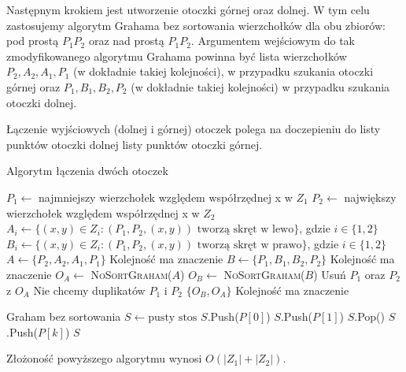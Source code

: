 Następnym krokiem jest utworzenie otoczki górnej oraz dolnej.
W tym celu zastosujemy algorytm Grahama bez sortowania 
wierzchołków dla obu
zbiorów: pod prostą $P_1P_2$ oraz nad prostą $P_1P_2$. 
Argumentem wejściowym do tak zmodyfikowanego algorytmu Grahama 
powinna być lista wierzchołków $P_2, A_2, A_1, P_1$
(w dokładnie takiej kolejności), w 
przypadku szukania otoczki górnej oraz $P_1, B_1, B_2, P_2$
(w dokładnie takiej kolejności) w przypadku
szukania otoczki dolnej.

Łączenie wyjściowych (dolnej i górnej) otoczek polega na 
doczepieniu do listy punktów otoczki dolnej listy punktów otoczki górnej.

\begin{algorithm}[H]
	\caption{Algorytm łączenia dwóch otoczek}
	\begin{algorithmic}[1]
		\State $P_1 \gets$ najmniejszy wierzchołek względem współrzędnej x w $Z_1$
		\State $P_2 \gets$ największy wierzchołek względem współrzędnej x w $Z_2$
		\State $A_i \gets \{(x, y) \in Z_i : (P_1, P_2, (x,y)) \text{ tworzą skręt w lewo}\}$, gdzie $i \in \{1, 2\}$
		\State $B_i \gets \{(x, y) \in Z_i : (P_1, P_2, (x,y)) \text{ tworzą skręt w prawo}\}$, gdzie $i \in \{1, 2\}$
		\State $A \gets \{P_2, A_2, A_1, P_1\}$ \Comment Kolejność ma znaczenie
		\State $B \gets \{P_1, B_1, B_2, P_2\}$ \Comment Kolejność ma znaczenie
		\State $O_A \gets$ \textsc{NoSortGraham($A$)}
		\State $O_B \gets$ \textsc{NoSortGraham($B$)}
		\State Usuń $P_1$ oraz $P_2$ z $O_A$ \Comment Nie chcemy duplikatów $P_1$ i $P_2$
		\State \Return $\{O_B, O_A\}$ \Comment Kolejność ma znaczenie
		\EndProcedure
		
		 \Comment Graham bez sortowania
		\State $S \gets \text{pusty stos}$
		\State $S$.Push($P[0]$)
		\State $S$.Push($P[1]$)
		\State $S$.Pop()
		\EndWhile
		\State $S$.Push($P[k]$)
		\EndFor
		\State \Return $S$
		\EndProcedure
	\end{algorithmic}
\end{algorithm}

Złożoność powyższego algorytmu wynosi $O(|Z_1| + |Z_2|)$.